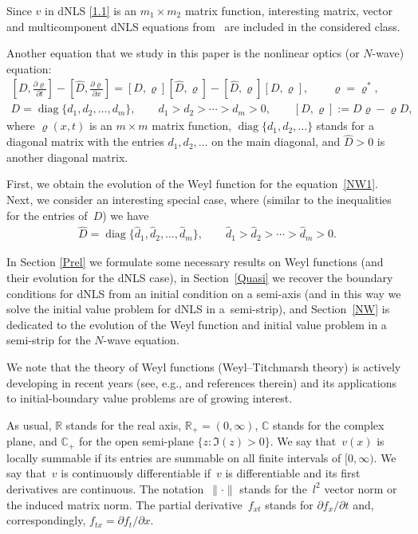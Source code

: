 \documentclass[pdftex]{sigma}
\def\di{\operatorname{diag}}
\def\vr{\varrho}
\def\wh{\widehat}
\def\p{\partial}
\def\prt{\partial}
\def\BC{{\mathbb C}}
\def\BR{{\mathbb R}}
\numberwithin{equation}{section}
\begin{document}
Since $v$ in dNLS \eqref{1.1} is an $m_1 \times m_2$ matrix function,
interesting matrix, vector and multicomponent dNLS equations from~\cite[Chapter~4]{Abl0}
are included in the considered class.


Another equation that we study in this paper is the nonlinear optics (or $N$-wave) equation:
\begin{gather} \label{NW1}
\left[D, \frac{\prt \vr}{\prt t} \right] - \left[\wh D, \frac{\prt \vr}{\prt x} \right]
=
[D, \vr] [\wh D, \vr] - [\wh D, \vr] [ D, \vr], \qquad \vr=\vr^*, \\
\label{NW2} D=
\di \{ d_1,  d_2, \ldots,
 d_m \}, \qquad d_1>d_2>\cdots>d_m>0, \qquad [D,\vr]:=D\vr-\vr D,
\end{gather}
where $\vr(x,t)$ is an $m\times m$ matrix function, $\di \{ d_1, d_2, \ldots \}$ stands for a diagonal matrix with the
entries $d_1, d_2, \dots$ on the main diagonal, and $\wh D>0$ is another diagonal matrix.

First, we obtain the evolution of the Weyl function for the equation~\eqref{NW1}.
 Next, we consider an interesting special case, where (similar to the inequalities for the entries of~$D$)
we have
\begin{gather} \label{NW3}
\wh D=\di \big\{ \wh d_1, \wh d_2, \ldots,
\wh d_m \big\}, \qquad \wh d_1> \wh d_2>\cdots> \wh d_m>0.
\end{gather}

In Section \ref{Prel} we formulate some necessary results on Weyl functions (and their evolution for the dNLS case), in Section~\ref{Quasi}
we recover the boundary conditions for dNLS from an initial condition on a semi-axis
(and in this way we solve the initial value problem for dNLS in a~semi-strip), and Section~\ref{NW}
is dedicated to the evolution of the Weyl function and initial value problem in a semi-strip for the $N$-wave equation.

We note that the theory of Weyl functions (Weyl--Titchmarsh theory) is actively developing in recent years (see, e.g., \cite{ClGe, DaKiS, FKS, GeZi,GKS6, KoSaTe,SaSaR, Sa99, Si0, Te}
and references therein) and its applications
to initial-boundary value problems are of growing interest.

As usual, $\BR$ stands for the real axis,
$\BR_+=(0, \infty)$,
$\BC$ stands for the complex plane, and
$\BC_+$ for the open semi-plane $\{z\colon \Im(z)>0\}$.
We say that~$v(x)$ is locally summable if its entries are summable on all f\/inite intervals of $[0, \infty)$.
We say that~$v$ is continuously dif\/ferentiable
if~$v$ is dif\/ferentiable and its f\/irst derivatives are continuous.
The notation~$\| \cdot \|$ stands for the~$l^2$ vector norm or the induced matrix norm.
The partial derivative~$f_{xt}$ stands for $\p f_x / \p t$ and, correspondingly, $f_{tx} = \p f_t / \p x$.
\end{document}

